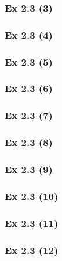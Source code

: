 \subsubsection{Ex 2.3 (3)}\label{sec:Ex_2.3.3}

\subsubsection{Ex 2.3 (4)}\label{sec:Ex_2.3.4}

\subsubsection{Ex 2.3 (5)}\label{sec:Ex_2.3.5}

\subsubsection{Ex 2.3 (6)}\label{sec:Ex_2.3.6}

\subsubsection{Ex 2.3 (7)}\label{sec:Ex_2.3.7}

\subsubsection{Ex 2.3 (8)}\label{sec:Ex_2.3.8}

\subsubsection{Ex 2.3 (9)}\label{sec:Ex_2.3.9}

\subsubsection{Ex 2.3 (10)}\label{sec:Ex_2.3.10}

\newpage		%

\subsubsection{Ex 2.3 (11)}\label{sec:Ex_2.3.11}

\subsubsection{Ex 2.3 (12)}\label{sec:Ex_2.3.12}


